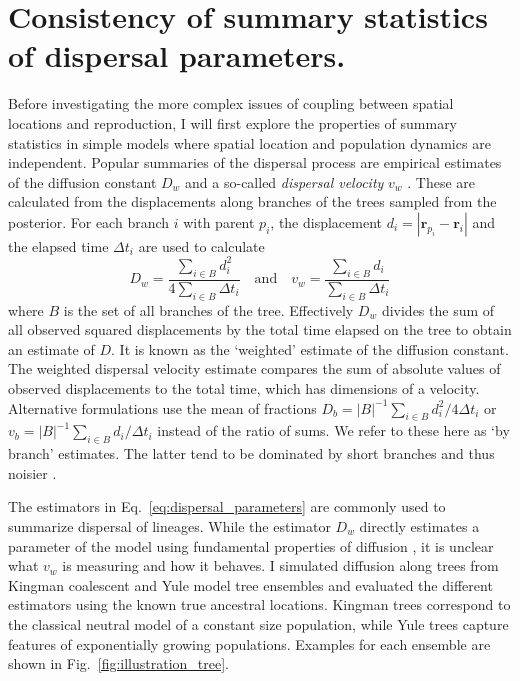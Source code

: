 \documentclass[aps,rmp, twocolumn]{revtex4}
\newcommand{\rvec}{\mathbf{r}}
\begin{document}
\section*{Consistency of summary statistics of dispersal parameters.}
Before investigating the more complex issues of coupling between spatial locations and reproduction, I will first explore the properties of summary statistics in simple models where spatial location and population dynamics are independent.
Popular summaries of the dispersal process are empirical estimates of the diffusion constant $D_w$ \citep{pybus_unifying_2012,trovao_bayesian_2015} and a so-called \emph{dispersal velocity} $v_w$ \citep{lemey_phylogeography_2010,raghwani_endemic_2011}.
These are calculated from the displacements along branches of the trees sampled from the posterior.
For each branch $i$ with parent $p_i$, the displacement $d_i = |\rvec_{p_i} - \rvec_{i}|$ and the elapsed time $\Delta t_i$ are used to calculate
\begin{equation}
    \label{eq:dispersal_parameters}
    D_w = \frac{\sum_{i\in B}d_i^2}{4\sum_{i\in B} \Delta t_i} \quad \mathrm{and}  \quad v_w = \frac{\sum_{i\in B} d_i}{\sum_{i\in B} \Delta t_i}
\end{equation}
where $B$ is the set of all branches of the tree.
Effectively $D_w$ divides the sum of all observed squared displacements by the total time elapsed on the tree to obtain an estimate of $D$.
It is known as the `weighted' estimate of the diffusion constant.
The weighted dispersal velocity estimate compares the sum of absolute values of observed displacements to the total time, which has dimensions of a velocity.
Alternative formulations use the mean of fractions $D_b = |B|^{-1} \sum_{i\in B}d_i^2/4\Delta t_i$ or $v_b = |B|^{-1} \sum_{i\in B}d_i/\Delta t_i$ instead of the ratio of sums.
We refer to these here as `by branch' estimates.
The latter tend to be dominated by short branches and thus noisier \citep{trovao_bayesian_2015}.

The estimators in Eq.~\ref{eq:dispersal_parameters} are commonly used to summarize dispersal of lineages.
While the estimator $D_w$ directly estimates a parameter of the model using fundamental properties of diffusion \citep{pybus_unifying_2012}, it is unclear what $v_w$ is measuring and how it behaves.
I simulated diffusion along trees from Kingman coalescent \citep{kingman_coalescent_1982} and Yule model \citep{yule_iimathematical_1925} tree ensembles and evaluated the different estimators using the known true ancestral locations.
Kingman trees correspond to the classical neutral model of a constant size population, while Yule trees capture features of exponentially growing populations.
Examples for each ensemble are shown in Fig.~\ref{fig:illustration_tree}.
\end{document}
